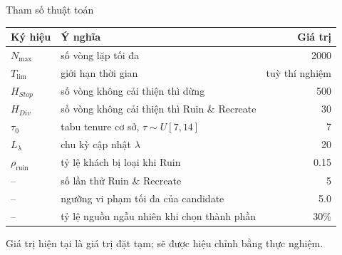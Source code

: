 \documentclass[aspectratio=169]{beamer}
\begin{document}
\begin{frame}{Tham số thuật toán}
  \centering
  \begin{tabular}{llr}
    \toprule
    Ký hiệu & Ý nghĩa & Giá trị \\
    \midrule
    $N_{\max}$ & số vòng lặp tối đa & 2000 \\
    $T_{\lim}$ & giới hạn thời gian & tuỳ thí nghiệm \\
    $H_{Stop}$ & số vòng không cải thiện thì dừng & 500 \\
    $H_{Div}$ & số vòng không cải thiện thì Ruin \& Recreate & 30 \\
    $\tau_0$ & tabu tenure cơ sở, $\tau \sim U[7, 14]$ & 7 \\
    $L_\lambda$ & chu kỳ cập nhật $\lambda$ & 20 \\
    $\rho_{\text{ruin}}$ & tỷ lệ khách bị loại khi Ruin & 0.15 \\
    -- & số lần thử Ruin \& Recreate & 5 \\
    -- & ngưỡng vi phạm tối đa của candidate & 5.0 \\
    -- & tỷ lệ nguồn ngẫu nhiên khi chọn thành phần & 30\% \\
    \bottomrule
  \end{tabular}

  \vspace{3mm}
  \small Giá trị hiện tại là giá trị đặt tạm; sẽ được hiệu chỉnh bằng thực nghiệm.
\end{frame}
\end{document}
